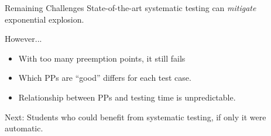 \documentclass[xcolor=dvipsnames]{beamer}
\begin{document}
%

\begin{frame}{Remaining Challenges}
	State-of-the-art systematic testing can {\em mitigate} exponential explosion.
	\linegap

	However...
	\begin{itemize}
		\item With too many preemption points, it still fails
		\item Which PPs are ``good'' differs for each test case.
		\item Relationship between PPs and testing time is unpredictable.
	\end{itemize}
	\pause
	\linegap

	Next: Students who could benefit from systematic testing, if only it were automatic.

\end{frame}
\end{document}
